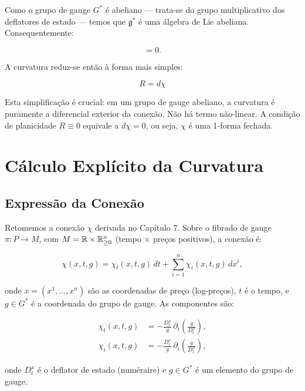 \noindent Como o grupo de gauge $G^*$ \'e abeliano --- trata-se do grupo multiplicativo dos deflatores de estado --- temos que $\mathfrak{g}^*$ \'e uma \'algebra de Lie abeliana. Consequentemente:

\begin{equation}
[\chi, \chi] = 0.
\end{equation}

\noindent A curvatura reduz-se ent\~ao \`a forma mais simples:

\begin{equation}
\boxed{R = d\chi}
\end{equation}

\noindent Esta simplifica\c{c}\~ao \'e crucial: em um grupo de gauge abeliano, a curvatura \'e puramente a diferencial exterior da conex\~ao. N\~ao h\'a termo n\~ao-linear. A condi\c{c}\~ao de planicidade $R \equiv 0$ equivale a $d\chi = 0$, ou seja, $\chi$ \'e uma 1-forma fechada.

\section{C\'alculo Expl\'icito da Curvatura}

\subsection{Express\~ao da Conex\~ao}

Retomemos a conex\~ao $\chi$ derivada no Cap\'itulo 7. Sobre o fibrado de gauge $\pi: P \to M$, com $M = \mathbb{R} \times \mathbb{R}^n_{\ge 0}$ (tempo $\times$ pre\c{c}os positivos), a conex\~ao \'e:

\begin{equation}
\chi(x, t, g) = \chi_t(x, t, g)\, dt + \sum_{i=1}^n \chi_i(x, t, g)\, dx^i,
\end{equation}

onde $x = (x^1, \dots, x^n)$ s\~ao as coordenadas de pre\c{c}o (log-pre\c{c}os), $t$ \'e o tempo, e $g \in G^*$ \'e a coordenada do grupo de gauge. As componentes s\~ao:

\begin{align}
\chi_t(x, t, g) &= -\frac{D_t^x}{g}\,\partial_t\left(\frac{g}{D_t^x}\right), \label{eq:chi_t}\\
\chi_i(x, t, g) &= -\frac{D_t^x}{g}\,\partial_i\left(\frac{g}{D_t^x}\right), \label{eq:chi_i}
\end{align}

onde $D_t^x$ \'e o deflator de estado (num\'eraire) e $g \in G^*$ \'e um elemento do grupo de gauge.


